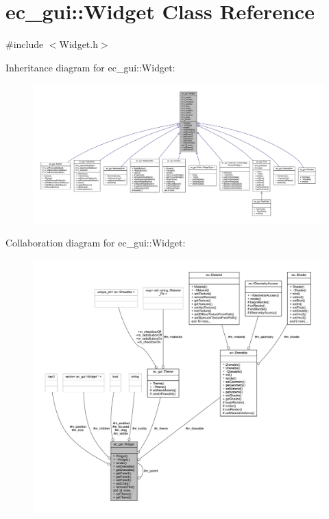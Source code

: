 \hypertarget{classec__gui_1_1_widget}{}\section{ec\+\_\+gui\+:\+:Widget Class Reference}
\label{classec__gui_1_1_widget}


{\ttfamily \#include $<$Widget.\+h$>$}



Inheritance diagram for ec\+\_\+gui\+:\+:Widget\+:\nopagebreak
\begin{figure}[H]
\begin{center}
\leavevmode
\includegraphics[width=350pt]{classec__gui_1_1_widget__inherit__graph}
\end{center}
\end{figure}


Collaboration diagram for ec\+\_\+gui\+:\+:Widget\+:\nopagebreak
\begin{figure}[H]
\begin{center}
\leavevmode
\includegraphics[width=350pt]{classec__gui_1_1_widget__coll__graph}
\end{center}
\end{figure}
